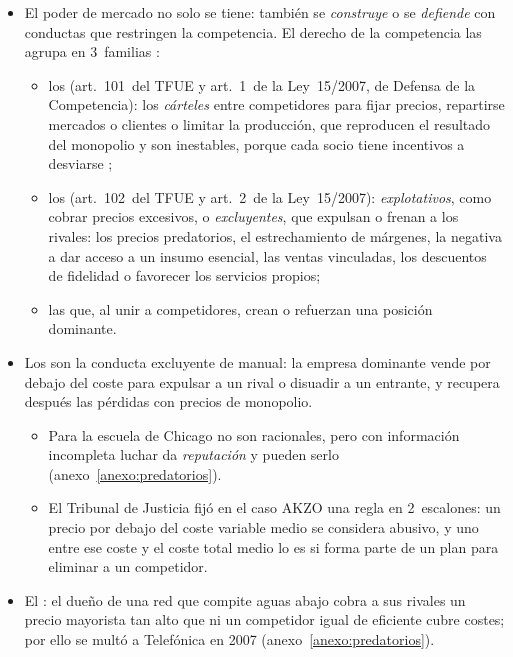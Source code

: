 \documentclass[11pt]{article}
\begin{document}
\begin{itemize}
\item El poder de mercado no solo se tiene: también se \emph{construye} o se \emph{defiende} con conductas que restringen la competencia. El derecho de la competencia las agrupa en 3~familias\nocite{UE2016TFUE,BOE2007LDC}  :
  \begin{itemize}
  \item los  (art.~101~del TFUE y art.~1~de la Ley~15/2007, de Defensa de la Competencia): los \emph{cárteles} entre competidores para fijar precios, repartirse mercados o clientes o limitar la producción, que reproducen el resultado del monopolio y son inestables, porque cada socio tiene incentivos a desviarse ;
  \item los  (art.~102~del TFUE y art.~2~de la Ley~15/2007): \emph{explotativos}, como cobrar precios excesivos, o \emph{excluyentes}, que expulsan o frenan a los rivales: los precios predatorios, el estrechamiento de márgenes, la negativa a dar acceso a un insumo esencial, las ventas vinculadas, los descuentos de fidelidad o favorecer los servicios propios;
  \item las  que, al unir a competidores, crean o refuerzan una posición dominante\nocite{UE2004Reglamento139}.
  \end{itemize}
\item Los  son la conducta excluyente de manual: la empresa dominante vende por debajo del coste para expulsar a un rival o disuadir a un entrante, y recupera después las pérdidas con precios de monopolio.
  \begin{itemize}
  \item Para la escuela de Chicago no son racionales\nocite{McGee1958Predatory}, pero con información incompleta luchar da \emph{reputación} y pueden serlo   (anexo~\ref{anexo:predatorios}).
  \item El Tribunal de Justicia fijó en el caso AKZO una regla en 2~escalones: un precio por debajo del coste variable medio se considera abusivo, y uno entre ese coste y el coste total medio lo es si forma parte de un plan para eliminar a un competidor\nocite{TJUE1991AKZO}.
  \end{itemize}
\item El : el dueño de una red que compite aguas abajo cobra a sus rivales un precio mayorista tan alto que ni un competidor igual de eficiente cubre costes; por ello se multó a Telefónica en 2007\nocite{TJUE2014Telefonica} (anexo~\ref{anexo:predatorios}).
\end{itemize}
\end{document}
